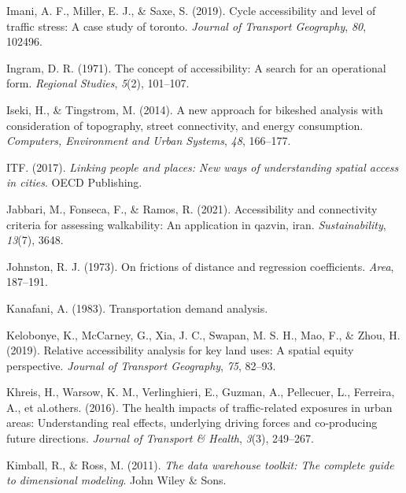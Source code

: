 \documentclass[12pt,twoside]{reedthesis}
\newlength{\cslhangindent}
\newenvironment{CSLReferences}[2] %
 {%
  \setlength{\parindent}{0pt}
  \ifodd #1 \everypar{\setlength{\hangindent}{\cslhangindent}}\ignorespaces\fi
  \ifnum #2 > 0
  \setlength{\parskip}{#2\baselineskip}
  \fi
 }%
 {}
\begin{document}
\begin{CSLReferences}{1}{0}
\leavevmode{}%
Imani, A. F., Miller, E. J., \& Saxe, S. (2019). Cycle accessibility and level of traffic stress: A case study of toronto. \emph{Journal of Transport Geography}, \emph{80}, 102496.

\leavevmode{}%
Ingram, D. R. (1971). The concept of accessibility: A search for an operational form. \emph{Regional Studies}, \emph{5}(2), 101--107.

\leavevmode{}%
Iseki, H., \& Tingstrom, M. (2014). A new approach for bikeshed analysis with consideration of topography, street connectivity, and energy consumption. \emph{Computers, Environment and Urban Systems}, \emph{48}, 166--177.

\leavevmode{}%
ITF. (2017). \emph{Linking people and places: New ways of understanding spatial access in cities}. OECD Publishing.

\leavevmode{}%
Jabbari, M., Fonseca, F., \& Ramos, R. (2021). Accessibility and connectivity criteria for assessing walkability: An application in qazvin, iran. \emph{Sustainability}, \emph{13}(7), 3648.

\leavevmode{}%
Johnston, R. J. (1973). On frictions of distance and regression coefficients. \emph{Area}, 187--191.

\leavevmode{}%
Kanafani, A. (1983). Transportation demand analysis.

\leavevmode{}%
Kelobonye, K., McCarney, G., Xia, J. C., Swapan, M. S. H., Mao, F., \& Zhou, H. (2019). Relative accessibility analysis for key land uses: A spatial equity perspective. \emph{Journal of Transport Geography}, \emph{75}, 82--93.

\leavevmode{}%
Khreis, H., Warsow, K. M., Verlinghieri, E., Guzman, A., Pellecuer, L., Ferreira, A., et al.others. (2016). The health impacts of traffic-related exposures in urban areas: Understanding real effects, underlying driving forces and co-producing future directions. \emph{Journal of Transport \& Health}, \emph{3}(3), 249--267.

\leavevmode{}%
Kimball, R., \& Ross, M. (2011). \emph{The data warehouse toolkit: The complete guide to dimensional modeling}. John Wiley \& Sons.


\end{CSLReferences}
\end{document}

